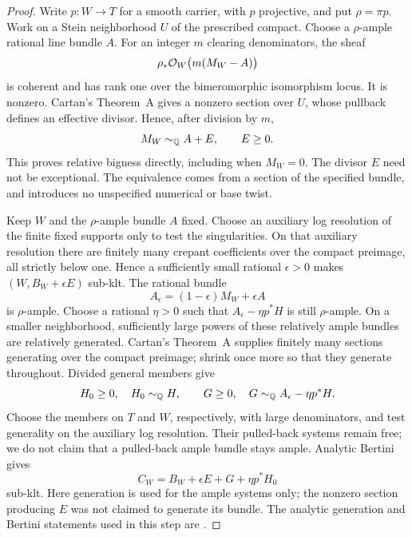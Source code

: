 \begin{proof}
Write $p\colon W\to T$ for a smooth carrier, with $p$ projective, and put
$\rho=\pi p$.  Work on a Stein neighborhood $U$ of the prescribed
compact.  Choose a $\rho$-ample rational line bundle $A$.  For an
integer $m$ clearing denominators, the sheaf
\[
 \rho_*\mathcal O_W\bigl(m(M_W-A)\bigr)
\]
is coherent and has rank one over the bimeromorphic isomorphism locus.
It is nonzero.  Cartan's Theorem~A gives a nonzero section over $U$,
whose pullback defines an effective divisor.  Hence, after division
by $m$,
\begin{equation}\label{eq:relative-kodaira-section}
 M_W\sim_{\mathbb Q} A+E,\qquad E\geq0.
\end{equation}
This proves relative bigness directly, including when $M_W=0$.
The divisor $E$ need not be exceptional.  The equivalence comes from
a section of the specified bundle, and introduces no unspecified
numerical or base twist.

Keep $W$ and the $\rho$-ample bundle $A$ fixed.  Choose an auxiliary
log resolution of the finite fixed supports only to test the
singularities.  On that auxiliary resolution there are finitely many
crepant coefficients over the compact preimage, all strictly below
one.  Hence a sufficiently small rational $\epsilon>0$ makes
$(W,B_W+\epsilon E)$ sub-klt.
The rational bundle
\[
 A_\epsilon=(1-\epsilon)M_W+\epsilon A
\]
is $\rho$-ample.  Choose a rational $\eta>0$ such that
$A_\epsilon-\eta p^*H$ is still $\rho$-ample.  On a smaller
neighborhood, sufficiently large powers of these relatively ample
bundles are relatively generated.  Cartan's Theorem~A supplies finitely
many sections generating over the compact preimage; shrink once more
so that they generate throughout.  Divided general members give
\[
 H_0\geq0,\quad H_0\sim_{\mathbb Q} H,
 \qquad G\geq0,\quad
 G\sim_{\mathbb Q} A_\epsilon-\eta p^*H.
\]
Choose the members on $T$ and $W$, respectively, with large
denominators, and test generality on the auxiliary log resolution.
Their pulled-back systems remain free; we do not claim that a pulled-back
ample bundle stays ample.  Analytic
Bertini gives
\[
 C_W=B_W+\epsilon E+G+\eta p^*H_0
\]
sub-klt.  Here generation is used for the ample systems only; the
nonzero section producing $E$ was not claimed to generate its bundle.
The analytic generation and Bertini statements used in this step are
\cite[Theorems~2.12 and~2.20]{DHP2024}.


\end{proof}
